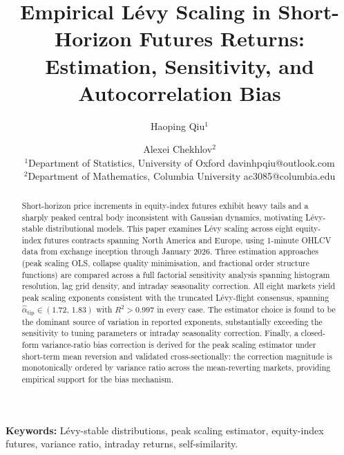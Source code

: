 \documentclass[12pt,a4paper]{article}
\begin{document}
\title{Empirical L\'{e}vy Scaling in Short-Horizon Futures Returns:
       Estimation, Sensitivity, and Autocorrelation Bias}

\author{Haoping Qiu$^1$ \and Alexei Chekhlov$^2$\\
\small{$^1$Department of Statistics, University of Oxford \quad davinhpqiu@outlook.com}\\
\small{$^2$Department of Mathematics, Columbia University \quad ac3085@columbia.edu}}

\maketitle

\tableofcontents
\newpage

\begin{abstract}
Short-horizon price increments in equity-index futures exhibit heavy tails
and a sharply peaked central body inconsistent with Gaussian dynamics,
motivating Lévy-stable distributional models.
This paper examines Lévy scaling across eight equity-index futures contracts
spanning North America and Europe, using 1-minute OHLCV data from exchange
inception through January 2026.
Three estimation approaches (peak scaling OLS, collapse quality
minimisation, and fractional order structure functions) are compared
across a full factorial sensitivity analysis spanning histogram resolution,
lag grid density, and intraday seasonality correction.
All eight markets yield peak scaling exponents consistent with the
truncated Lévy-flight consensus, spanning $\hat{\alpha}_{\mathrm{tip}}\in(1.72,\,1.83)$
with $R^2>0.997$ in every case.
The estimator choice is found to be the dominant source of variation in
reported exponents, substantially exceeding the sensitivity to tuning
parameters or intraday seasonality correction.
Finally, a closed-form variance-ratio bias correction is derived for the
peak scaling estimator under short-term mean reversion and validated
cross-sectionally: the correction magnitude is monotonically ordered by
variance ratio across the mean-reverting markets, providing empirical
support for the bias mechanism.
\end{abstract}

\medskip\noindent\textbf{Keywords:} Lévy-stable distributions, peak scaling estimator, equity-index futures, variance ratio, intraday returns, self-similarity.
\end{document}
